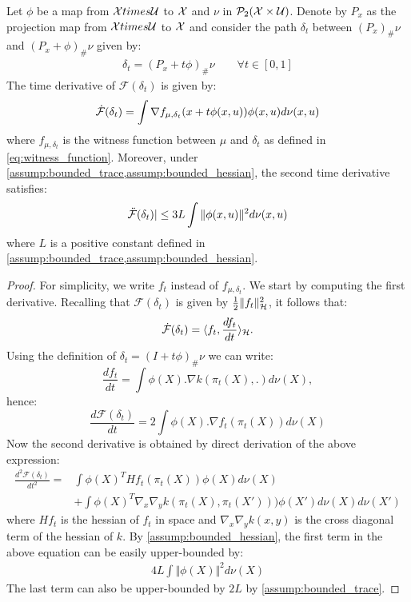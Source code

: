 \begin{lemma}\label{lem:derivative_mmd_augmented}
	Let $\phi$ be a map from  ${{\mathcal X}} times\mathcal{U} $ to ${{\mathcal X}}$  and $\nu$ in $\mathcal{P}_2({{\mathcal X}} \times \mathcal{U})$. Denote by  $P_x$ as the projection map from ${{\mathcal X}} times\mathcal{U}$ to ${{\mathcal X}}$ and consider the path $\delta_t$ between $(P_x)_{\#}\nu$ and $(P_x+\phi)_{\#}\nu$ given by:
	\begin{align*}
		\delta_t=  (P_x+t\phi)_{\#}\nu \qquad \forall t\in [0,1]
	\end{align*}
The time derivative of $\mathcal{F}(\delta_t)$ is given by:
	\begin{align*}
		\dot{{{\mathcal F}}}(\delta_t)&=\int \nabla f_{\mu,\delta_t}(x+t\phi(x,u)) \phi(x,u)d\nu(x,u)\\
	\end{align*}
where $f_{\mu,\delta_t}$ is the witness function between $\mu$ and $\delta_t$ as defined in \cref{eq:witness_function}.	
	Moreover, under \cref{assump:bounded_trace,assump:bounded_hessian}, the second time derivative satisfies:
	\begin{align*}
		\ddot{{{\mathcal F}}}(\delta_t) \vert \leq 3L \int \Vert \phi(x,u) \Vert^2 d\nu(x,u)
	\end{align*}
	where $L$ is a positive constant defined in \cref{assump:bounded_trace,assump:bounded_hessian}.
	
\end{lemma}
\begin{proof}
For simplicity, we write $f_t$ instead of $f_{\mu,\delta_t}$.
We start by computing the first derivative. Recalling that $\mathcal{F}(\delta_t)$ is given by $\frac{1}{2}\Vert f_t\Vert^2_{{{\mathcal H}}} $, it follows that:
\[
\dot{{{\mathcal F}}}(\delta_t)=\langle f_{t},\frac{df_{t}}{dt}\rangle_{{{\mathcal H}}}.
\]
Using the definition
of $\delta_{t}=(I+t\phi)_{\#}\nu$ we can write:
\[
\frac{df_{t}}{dt}=\int \phi(X).\nabla k(\pi_{t}(X),.)d\nu(X),
\]
hence:
\[
\frac{d\mathcal{F}(\delta_{t})}{dt}=2\int\phi(X).\nabla f_{t}(\pi_{t}(X))d\nu(X)
\]
Now the second derivative is obtained by direct derivation of the above expression:
	\begin{align*}
		\frac{d^2 \mathcal{F}(\delta_t)}{dt^2} =& \int \phi(X)^THf_t(\pi_t(X))\phi(X)d\nu(X)\\ 
		&+\int \phi(X)^T\nabla_x\nabla_y k(\pi_t(X),\pi_t(X')) ) \phi(X')d\nu(X)d\nu(X') 
	\end{align*}
where $Hf_t$ is the hessian of $f_t$ in space and  $\nabla_x\nabla_y k(x,y)$ is the cross diagonal term of the hessian of $k$. By \cref{assump:bounded_hessian}, the first term in the above equation can be easily upper-bounded by:
\begin{align*}
	4L \int \Vert \phi(X)\Vert^2d\nu(X)  
\end{align*}
The last term can also be upper-bounded by $2L$ by \cref{assump:bounded_trace}.
\end{proof}


